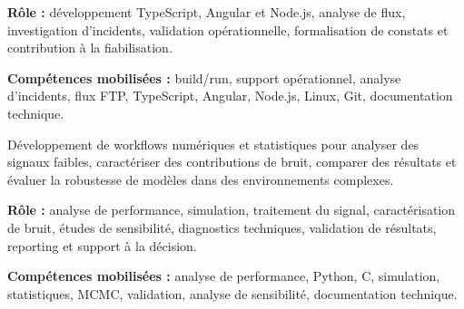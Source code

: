 \documentclass[8pt,a4paper,ragged2e,withhyper]{altacv}
\begin{document}
\textbf{Rôle :} développement TypeScript, Angular et Node.js, analyse de flux, investigation d’incidents, validation opérationnelle, formalisation de constats et contribution à la fiabilisation.

\textbf{Compétences mobilisées :} build/run, support opérationnel, analyse d’incidents, flux FTP, TypeScript, Angular, Node.js, Linux, Git, documentation technique.

\divider


Développement de workflows numériques et statistiques pour analyser des signaux faibles, caractériser des contributions de bruit, comparer des résultats et évaluer la robustesse de modèles dans des environnements complexes.

\textbf{Rôle :} analyse de performance, simulation, traitement du signal, caractérisation de bruit, études de sensibilité, diagnostics techniques, validation de résultats, reporting et support à la décision.

\textbf{Compétences mobilisées :} analyse de performance, Python, C, simulation, statistiques, MCMC, validation, analyse de sensibilité, documentation technique.


\vspace{-.3cm}


{\small
{}
}

\divider\smallskip
\vspace{-.3cm}


{\small
{}
}
\end{document}

